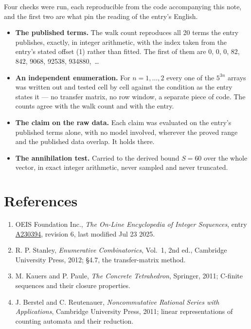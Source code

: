 \documentclass[11pt]{article}
\theoremstyle{definition}
\begin{document}
Four checks were run, each reproducible from the code accompanying this note, and the first two are what pin the reading of the entry's English.

\begin{itemize}

\item {\bfseries The published terms.} The walk count reproduces all 20 terms the entry publishes, exactly, in integer arithmetic, with the index taken from the entry's stated offset (1) rather than fitted. The first of them are 0, 0, 0, 82, 842, 9068, 92538, 934880,~\dots

\item {\bfseries An independent enumeration.} For $n = 1,\dots,2$ every one of the $5^{3n}$ arrays was written out and tested cell by cell against the condition as the entry states it --- no transfer matrix, no row window, a separate piece of code. The counts agree with the walk count and with the entry.

\item {\bfseries The claim on the raw data.} Each claim was evaluated on the entry's published terms alone, with no model involved, wherever the proved range and the published data overlap. It holds there.

\item {\bfseries The annihilation test.} Carried to the derived bound $S = 60$ over the whole vector, in exact integer arithmetic, never sampled and never truncated.

\end{itemize}

\section{References}

\begin{enumerate}

\item OEIS Foundation Inc., \emph{The On-Line Encyclopedia of Integer Sequences}, entry \href{https://oeis.org/A230394}{A230394}, revision 6, last modified Jul 23 2025.

\item R. P. Stanley, \emph{Enumerative Combinatorics}, Vol.~1, 2nd ed., Cambridge University Press, 2012; \S4.7, the transfer-matrix method.

\item M. Kauers and P. Paule, \emph{The Concrete Tetrahedron}, Springer, 2011; C-finite sequences and their closure properties.

\item J. Berstel and C. Reutenauer, \emph{Noncommutative Rational Series with Applications}, Cambridge University Press, 2011; linear representations of counting automata and their reduction.

\end{enumerate}
\end{document}
